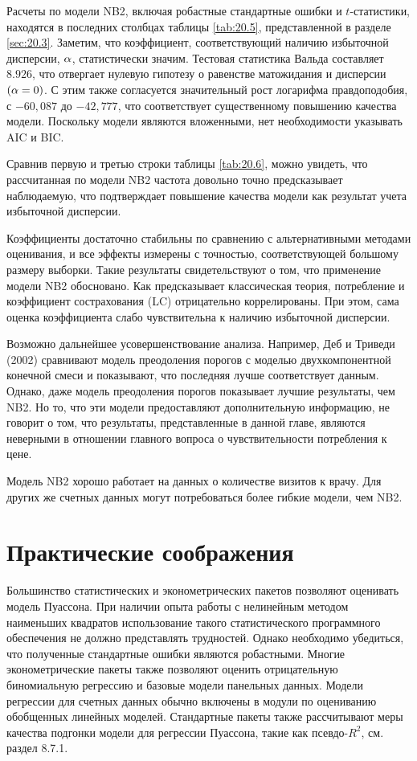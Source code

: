 Расчеты по модели NB2, включая робастные стандартные ошибки и $t$-статистики, находятся в последних столбцах таблицы \ref{tab:20.5}, представленной в разделе \ref{sec:20.3}. Заметим, что коэффициент, соответствующий наличию избыточной дисперсии, $\alpha$, статистически значим.
Тестовая статистика Вальда составляет $8.926$, что отвергает нулевую гипотезу о равенстве матожидания и дисперсии $(\alpha = 0)$. С этим также согласуется значительный рост логарифма правдоподобия, с $-60,087$ до $-42,777$, что соответствует существенному повышению качества модели. Поскольку модели являются вложенными, нет необходимости указывать AIC и BIC.

Сравнив первую и третью строки таблицы \ref{tab:20.6}, можно увидеть, что рассчитанная по модели NB2 частота довольно точно предсказывает наблюдаемую, что подтверждает повышение качества модели как результат учета избыточной дисперсии.

Коэффициенты достаточно стабильны по сравнению с альтернативными методами оценивания, и все эффекты измерены с точностью, соответствующей большому размеру выборки. Такие результаты свидетельствуют о том, что применение модели NB2 обосновано. Как предсказывает классическая теория, потребление и коэффициент сострахования (LC) отрицательно коррелированы. При этом, сама оценка коэффициента слабо чувствительна к наличию избыточной дисперсии.

Возможно дальнейшее усовершенствование анализа. Например, Деб и Триведи (2002) сравнивают модель преодоления порогов с моделью двухкомпонентной конечной смеси и показывают, что последняя лучше соответствует данным. Однако, даже модель преодоления порогов показывает лучшие результаты, чем NB2. Но то, что эти модели предоставляют дополнительную информацию, не говорит о том, что результаты, представленные в данной главе, являются неверными в отношении главного вопроса о чувствительности потребления к цене.

Модель NB2 хорошо работает на данных о количестве визитов к врачу. Для других же счетных данных могут потребоваться более гибкие модели, чем NB2.




\section{Практические соображения}\label{sec:20.8}

\noindent
Большинство статистических и эконометрических пакетов позволяют оценивать модель Пуассона. При наличии опыта работы с нелинейным методом наименьших квадратов использование такого статистического программного обеспечения не должно представлять трудностей. Однако необходимо убедиться, что полученные стандартные ошибки являются робастными. Многие эконометрические пакеты также позволяют оценить отрицательную биномиальную регрессию и базовые модели панельных данных. Модели регрессии для счетных данных обычно включены в модули по оцениванию обобщенных линейных моделей. Стандартные пакеты также рассчитывают меры качества подгонки модели для регрессии Пуассона, такие как псевдо-$R^2$, см. раздел 8.7.1.

